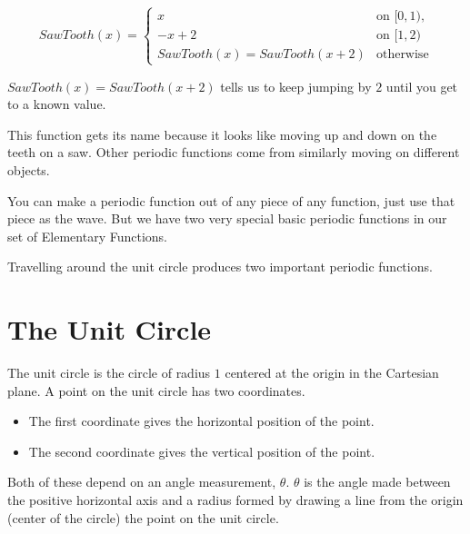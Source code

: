 \documentclass{ximera}
\begin{document}
\[
SawTooth(x) = 
\begin{cases}
  x &\text{on $[0,1)$,} \\
  -x+2 &\text{on $[1,2)$} \\ 
  SawTooth(x) = SawTooth(x+2) & \text{otherwise}
\end{cases}
\]


$SawTooth(x) = SawTooth(x+2)$ tells us to keep jumping by $2$ until you get to a known value.


This function gets its name because it looks like moving up and down on the teeth on a saw. Other periodic functions come from similarly moving on different objects. 




You can make a periodic function out of any piece of any function, just use that piece as the wave. But we have two very special basic periodic functions in our set of Elementary Functions.



Travelling around the unit circle produces two important periodic functions.














\section{The Unit Circle}


The unit circle is the circle of radius $1$ centered at the origin in the Cartesian plane. A point on the unit circle has two coordinates.  

\begin{itemize}
\item The first coordinate gives the horizontal position of the point. 
\item The second coordinate gives the vertical position of the point.  
\end{itemize}

Both of these depend on an angle measurement, $\theta$. $\theta$ is the angle made between the positive horizontal axis and a radius formed by drawing a line from the origin (center of the circle) the point on the unit circle.
\end{document}
